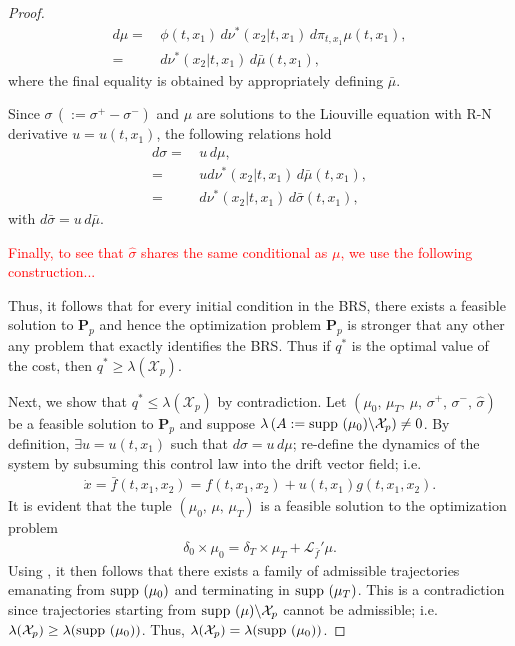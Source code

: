 \documentclass[dvipsnames]{article}
\providecommand{\supp}{\ensuremath \text{supp }}
\begin{document}
\begin{proof}
\begin{align*}
\label{eq:domination:conditional:2}
   d\mu =&\,\phi(t,x_1)\,d\nu^*(x_2|t,x_1)\,d\pi_{t,x_1}\mu(t,x_1),\\\nonumber
    =&\,d\nu^*(x_2|t,x_1)\,d\bar\mu(t,x_1),
\end{align*}
where the final equality is obtained by appropriately defining $\bar\mu$.
\par
Since $\sigma\,(:=\sigma^+-\sigma^-)$ and $\mu$ are solutions to the Liouville equation with R-N derivative \mbox{$u=u(t,x_1)$}, the following relations hold
\begin{align*}
  d\sigma=&\,u\,d\mu,\\
  =&\,ud\nu^*(x_2|t,x_1)\,d\bar\mu(t,x_1),\\
  =&\,d\nu^*(x_2|t,x_1)\,d\bar\sigma(t,x_1),
\end{align*}
with $d\bar \sigma=u\,d\bar\mu$.\par
\textcolor{red}{Finally, to see that $\hat\sigma$ shares the same conditional as $\mu$, we use the following construction...}
\par
Thus, it follows that for every initial condition in the BRS, there exists a feasible solution to {\bf P$_p$} and hence the optimization problem {\bf P$_p$} is stronger that any other any problem that exactly identifies the BRS. Thus if $q^*$ is the optimal value of the cost, then $q^*\ge \lambda(\mathcal X_p)$.
\par
Next, we show that $q^*\le \lambda(\mathcal X_p)$ by contradiction. Let $(\mu_0,\,\mu_T,\,\mu,\,\sigma^+,\,\sigma^-,\,\hat\sigma)$ be a feasible solution to {\bf P$_p$} and suppose $\lambda\,(A:=\supp(\mu_0)\backslash \mathcal X_p)\ne 0$. By definition, $\exists u=u(t,x_1)$ such that $d\sigma=u\,d\mu$; re-define the dynamics of the system by subsuming this control law into the drift vector field; i.e.
\begin{align*}
  \dot x=\bar f(t,x_1,x_2)=f(t,x_1,x_2)+u(t,x_1)g(t,x_1,x_2).
\end{align*}
It is evident that the tuple $(\mu_0,\,\mu,\,\mu_T)$ is a feasible solution to the optimization problem
\begin{align*}
  \delta_0\times \mu_0=\delta_T\times \mu_T+\mathcal L_{\bar f}'\mu.
\end{align*}
Using \cite[Lemma 3]{Henrion}, it then follows that there exists a family of admissible trajectories emanating from $\supp(\mu_0)$ and terminating in $\supp(\mu_T)$. This is a contradiction since trajectories starting from $\supp(\mu)\backslash \mathcal X_p$ cannot be admissible; i.e. $\lambda(\mathcal X_p)\ge \lambda(\supp(\mu_0))$. Thus, $\lambda(\mathcal X_p)=\lambda(\supp (\mu_0))$.
\end{proof}
\end{document}
